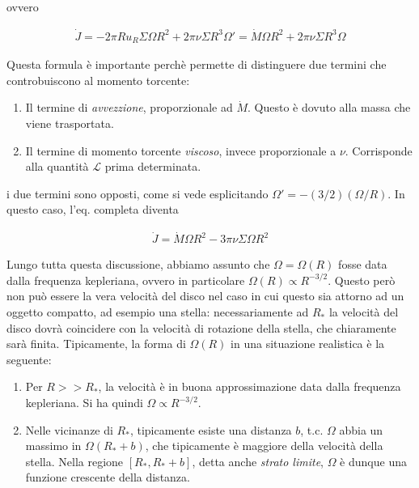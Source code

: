 \documentclass{report}
\begin{document}
ovvero 

\begin{align}
    \dot{J} = -2\pi R u_R \Sigma \Omega R^2 + 2\pi \nu \Sigma R^3 \Omega' = \dot{M}\Omega R^2 + 2\pi \nu \Sigma R^3 \Omega
\end{align}

Questa formula è importante perchè permette di distinguere due termini che controbuiscono al momento torcente: 

\begin{enumerate}
    \item Il termine di \emph{avvezzione}, proporzionale ad \(\dot{M}\). Questo è dovuto alla massa che viene trasportata. 
    \item Il termine di momento torcente \emph{viscoso}, invece proporzionale a \(\nu\). Corrisponde alla quantità \(\mathcal{L}\) prima determinata. 
\end{enumerate}

i due termini sono opposti, come si vede esplicitando \(\Omega' = -(3/2)(\Omega/R)\). In questo caso, l'eq. completa diventa 

\begin{align}
    \dot{J} = \dot{M}\Omega R^2 - 3\pi \nu \Sigma \Omega R^2
\end{align}

Lungo tutta questa discussione, abbiamo assunto che \(\Omega = \Omega(R)\) fosse data dalla frequenza kepleriana, ovvero in particolare \(\Omega(R) \propto R^{-3/2}\). Questo però non può essere la vera velocità del disco nel caso in cui questo sia attorno ad un oggetto compatto, ad esempio una stella: necessariamente ad \(R_*\) la velocità del disco dovrà coincidere con la velocità di rotazione della stella, che chiaramente sarà finita. Tipicamente, la forma di \(\Omega(R)\) in una situazione realistica è la seguente: 

\begin{enumerate}
    \item Per \(R >> R_*\), la velocità è in buona approssimazione data dalla frequenza kepleriana. Si ha quindi \(\Omega \propto R^{-3/2}\). 
    \item Nelle vicinanze di \(R_{*}\), tipicamente esiste una distanza \(b\), t.c. \(\Omega\) abbia un massimo in \(\Omega(R_* + b)\), che tipicamente è maggiore della velocità della stella. Nella regione \([R_*, R_* +b]\), detta anche \emph{strato limite}, \(\Omega\) è dunque una funzione crescente della distanza. 
\end{enumerate}
\end{document}

